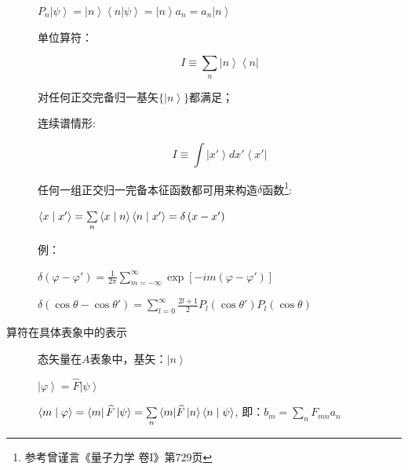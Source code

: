 \begin{description}

$P_n \left| \psi  \right\rangle  = \left| n \right\rangle \left\langle n \right|\left. \psi  \right\rangle  = \left| n \right\rangle a_n  = a_n \left| n \right\rangle $


单位算符：

\begin{equation}
I \equiv \sum\limits_n {\left| n \right\rangle \left\langle n \right|} 
\end{equation}

对任何正交完备归一基矢$\{ \left| n \right\rangle \} $都满足；


连续谱情形:

\begin{equation}
I \equiv \int {\left| {x'} \right\rangle }
dx'\left\langle {x'} \right|
\end{equation}

任何一组正交归一完备本征函数都可用来构造$\delta$函数\footnote{参考曾谨言《量子力学 卷I》第729页}:


$\left\langle {x}
 \mathrel{\left | {\vphantom {x {x'}}}
 \right. \kern-\nulldelimiterspace}
 {{x'}} \right\rangle  = \sum\limits_n {\left\langle {x}
 \mathrel{\left | {\vphantom {x n}}
 \right. \kern-\nulldelimiterspace}
 {n} \right\rangle \left\langle {n}
 \mathrel{\left | {\vphantom {n {x'}}}
 \right. \kern-\nulldelimiterspace}
 {{x'}} \right\rangle }  = \delta \left( {x - x'} \right)$

例：

$\delta \left( {\varphi  - \varphi '} \right) = \frac{1}{{2\pi
}}\sum\limits_{m =  - \infty }^\infty  {\exp \left[ { - im\left(
{\varphi  - \varphi '} \right)} \right]} $

$\delta \left( {\cos \theta  - \cos \theta '} \right) =
\sum\limits_{l = 0}^\infty  {\frac{{2l + 1}}{2}P_l (\cos \theta
')P_l (\cos \theta )} $



\item[算符在具体表象中的表示] 态矢量在$A$表象中，基矢：$\left| n \right\rangle $

$\left| \varphi  \right\rangle  = \widehat F\left| \psi  \right\rangle $


$\left\langle {m}
 \mathrel{\left | {\vphantom {m \varphi }}
 \right. \kern-\nulldelimiterspace}
 {\varphi } \right\rangle  = \left\langle m \right|\widehat F\left| \psi  \right\rangle  = \sum\limits_n {\left\langle m \right|} \widehat F\left| n \right\rangle \left\langle {n}
 \mathrel{\left | {\vphantom {n \psi }}
 \right. \kern-\nulldelimiterspace}
 {\psi } \right\rangle $, 即：$b_m  = \sum\limits_n {F_{mn} a_n } $


\end{description}
